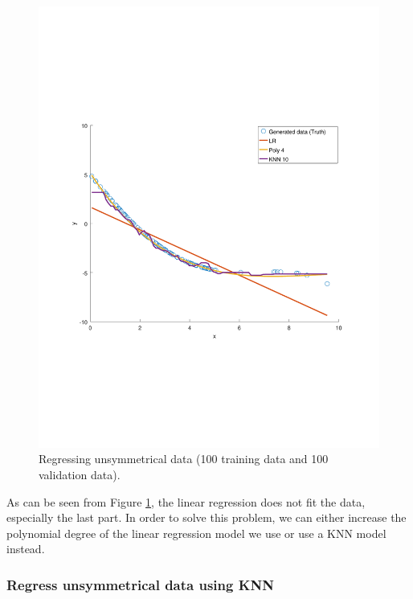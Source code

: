 \documentclass[]{article}
\begin{document}
\begin{figure}[ht]
	\centering
	\includegraphics[trim= 10cm 5cm 10cm 5cm, scale=0.4]{proj1-3_2c}
	\caption{Regressing unsymmetrical data (100 training data and 100 validation data).}
	\label{fig:unsymmetrical}
\end{figure}

As can be seen from Figure \ref{fig:unsymmetrical}, the linear regression does not fit the data, especially the last part. In order to solve this problem, we can either increase the polynomial degree of the linear regression model we use or use a KNN model instead.

\subsubsection{Regress unsymmetrical data using KNN}
\end{document}
